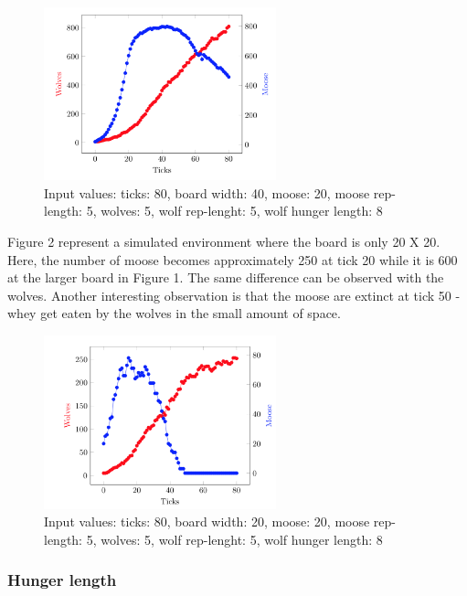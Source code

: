 \documentclass[a4paper]{report}
\begin{document}
\begin{figure}[H]
\centering
\includegraphics[width=0.60\textwidth]{Experiments/sim_board_b1}
\caption{Input values: ticks: 80, board width: 40, moose: 20, moose rep-length: 5, wolves: 5, wolf rep-lenght: 5, wolf hunger length: 8}
\end{figure}

Figure 2 represent a simulated environment where the board is only 20 X 20. Here, the number of moose becomes approximately 250 at tick 20 while it is 600 at the larger board in Figure 1. The same difference can be observed with the wolves. Another interesting observation is that the moose are extinct at tick 50 - whey get eaten by the wolves in the small amount of space. 

\begin{figure}[H]
\centering
\includegraphics[width=0.60\textwidth]{Experiments/sim_board_b2} 
\caption{Input values: ticks: 80, board width: 20, moose: 20, moose rep-length: 5, wolves: 5, wolf rep-lenght: 5, wolf hunger length: 8}
\end{figure}

\subsubsection*{Hunger length}
\end{document}
